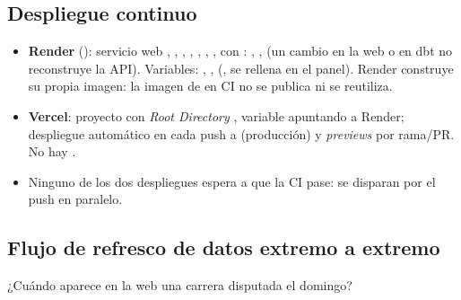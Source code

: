 \subsection{Despliegue continuo}

\begin{itemize}
\item \textbf{Render} (): servicio web , , , , , , ,  con \textbf{}: , ,  (un cambio en la web o en dbt no reconstruye la API). Variables: , ,  (, se rellena en el panel). Render construye su propia imagen: la imagen de  en CI no se publica ni se reutiliza.
\item \textbf{Vercel}: proyecto con \emph{Root Directory} , variable  apuntando a Render; despliegue automático en cada push a  (producción) y \emph{previews} por rama/PR. No hay .
\item Ninguno de los dos despliegues espera a que la CI pase: se disparan por el push en paralelo.
\end{itemize}

\subsection{Flujo de refresco de datos extremo a extremo}

¿Cuándo aparece en la web una carrera disputada el domingo?

